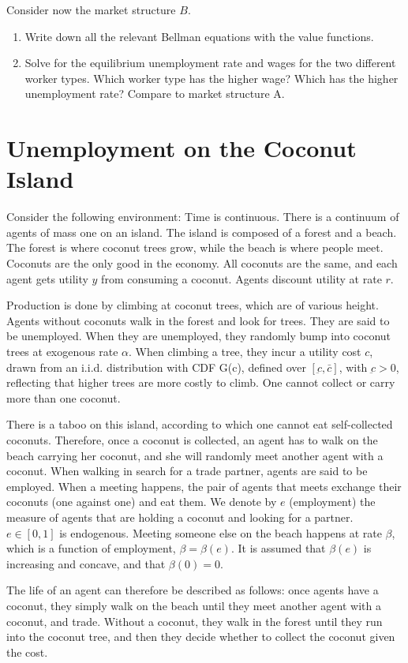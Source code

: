 \documentclass[11pt]{article}
\newcommand{\ben}{\begin{enumerate}}
\newcommand{\een}{\end{enumerate}}
\newcommand\setItemnumber[1]{\setcounter{enumi}{\numexpr#1-1\relax}}
\begin{document}
Consider now the market structure $B$.
\ben
\setItemnumber{3}
\item Write down all the relevant Bellman equations with the value functions.

\item Solve for the equilibrium unemployment rate and wages for the two different worker types. Which worker type has the higher wage? Which has the higher unemployment rate? Compare to market structure A.
\een



\section{Unemployment on the Coconut Island}
Consider the following environment: Time is continuous. There is a continuum of agents of mass one on an island. The island is composed of a forest and a beach. The forest is where coconut trees grow, while the beach is where people meet. Coconuts are the only good in the economy. All coconuts are the same, and each agent gets utility $y$ from consuming a coconut. Agents discount utility at rate $r$. 

Production is done by climbing at coconut trees, which are of various height. Agents without coconuts walk in the forest and look for trees. They are said to be unemployed. When they are unemployed, they randomly bump into coconut trees at exogenous rate $\alpha$. When climbing a tree, they incur a utility cost $c$, drawn from an i.i.d. distribution with CDF  G(c), defined over $[\underbar c, \bar c]$, with $\underbar c >0$, reflecting that higher trees are more costly to climb. One cannot collect or carry more than one coconut.

There is a taboo on this island, according to which one cannot eat self-collected coconuts. Therefore, once a coconut is collected, an agent has to walk on the beach carrying her coconut, and she will randomly meet another agent with a coconut. When walking in search for a trade partner, agents are said to be employed. When a meeting happens, the pair of agents that meets exchange their coconuts (one against one) and eat them. We denote by $e$ (employment) the measure of agents that are holding a coconut and looking for a partner. $e \in [0,1]$ is endogenous. Meeting someone else on the beach happens at rate $\beta$, which is a function of employment, $\beta = \beta(e)$. It is assumed that $\beta(e)$ is increasing and concave, and that $\beta(0)=0$.

The life of an agent can therefore be described as follows: once agents have a coconut, they simply walk on the beach until they meet another agent with a coconut, and trade. Without a coconut, they walk in the forest until they run into the coconut tree, and then they decide whether to collect the coconut given the cost. 
\end{document}
